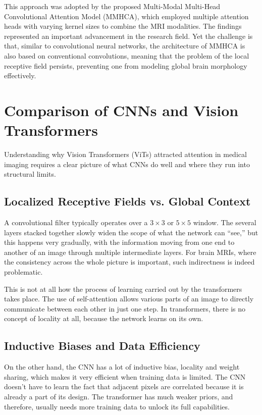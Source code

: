 This approach was adopted by the proposed Multi-Modal Multi-Head Convolutional Attention Model (MMHCA), which employed multiple attention heads with varying kernel sizes to combine the MRI modalities. The findings represented an important advancement in the research field. Yet the challenge is that, similar to convolutional neural networks, the architecture of MMHCA is also based on conventional convolutions, meaning that the problem of the local receptive field persists, preventing one from modeling global brain morphology effectively.

\section{Comparison of CNNs and Vision Transformers}
Understanding why Vision Transformers (ViTs) attracted attention in medical imaging requires a clear picture of what CNNs do well and where they run into structural limits.

\subsection{Localized Receptive Fields vs. Global Context}
A convolutional filter typically operates over a $3 \times 3$ or $5 \times 5$ window. The several layers stacked together slowly widen the scope of what the network can ``see,'' but this happens very gradually, with the information moving from one end to another of an image through multiple intermediate layers. For brain MRIs, where the consistency across the whole picture is important, such indirectness is indeed problematic.

This is not at all how the process of learning carried out by the transformers takes place. The use of self-attention allows various parts of an image to directly communicate between each other in just one step. In transformers, there is no concept of locality at all, because the network learns on its own.

\subsection{Inductive Biases and Data Efficiency}
On the other hand, the CNN has a lot of inductive bias, locality and weight sharing, which makes it very efficient when training data is limited. The CNN doesn't have to learn the fact that adjacent pixels are correlated because it is already a part of its design. The transformer has much weaker priors, and therefore, usually needs more training data to unlock its full capabilities.

